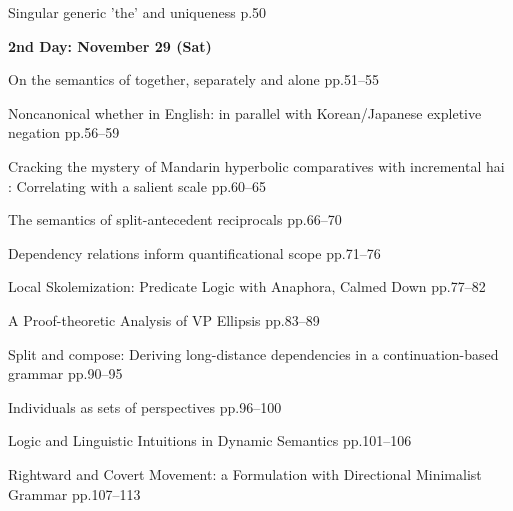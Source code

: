 \documentclass[12pt]{ltjarticle}
\begin{document}
  
     {Singular generic 'the' and uniqueness}
     {p.50}




\noindent\textbf{\large 
2nd Day: November 29 (Sat)
}\\




  
     {On the semantics of together, separately and alone}
     {pp.51--55}
  
     {Noncanonical whether in English: in parallel with Korean/Japanese expletive negation}
     {pp.56--59}
  
     {Cracking the mystery of Mandarin hyperbolic comparatives with incremental hai : Correlating with a salient scale}
     {pp.60--65}




  
     {The semantics of split-antecedent reciprocals}
     {pp.66--70}
  
     {Dependency relations inform quantificational scope}
     {pp.71--76}
  
     {Local Skolemization: Predicate Logic with Anaphora, Calmed Down}
     {pp.77--82}




  
     {A Proof-theoretic Analysis of VP Ellipsis}
     {pp.83--89}
  
     {Split and compose: Deriving long-distance dependencies in a continuation-based grammar}
     {pp.90--95}
  
     {Individuals as sets of perspectives}
     {pp.96--100}




  
     {Logic and Linguistic Intuitions in Dynamic Semantics}
     {pp.101--106}
  
     {Rightward and Covert Movement: a Formulation with Directional Minimalist Grammar}
     {pp.107--113}



\end{document}
